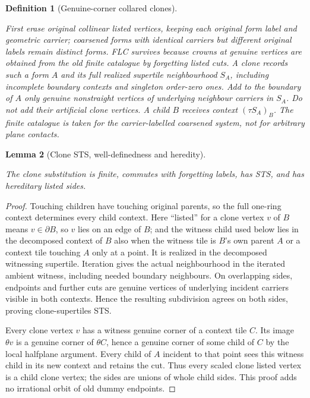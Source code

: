 \documentclass[11pt,a4paper]{article}
\newtheorem{definition}{Definition}[section]
\newtheorem{lemma}[definition]{Lemma}
\theoremstyle{remark}
\newcommand{\lean}[1]{}
\newcommand{\uses}[1]{}
\begin{document}
\begin{definition}[Genuine-corner collared clones]\label{def:clones}
\lean{Tilings.FLC.GenuineCornerClone,Tilings.FLC.refinedSubstitution}
\uses{lem:finite-neighbourhoods,def:substitution}
First erase original collinear listed vertices, keeping each original form
label and geometric carrier; coarsened forms with identical carriers but
different original labels remain distinct forms. FLC survives because crowns at genuine vertices
are obtained from the old finite catalogue by forgetting listed cuts.
A clone records such a form $A$ and its full realized supertile neighbourhood
$S_A$, including incomplete boundary contexts and singleton order-zero ones.
Add to the boundary of $A$ only genuine nonstraight vertices of underlying
neighbour carriers in $S_A$. Do not add their artificial clone vertices.
A child $B$ receives context $(\tau S_A)_B$. The finite catalogue is taken
for the carrier-labelled coarsened system, not for arbitrary plane contacts.
\end{definition}

\begin{lemma}[Clone STS, well-definedness and heredity]\label{lem:clone-sts}
\lean{Tilings.FLC.refinedSubstitution_sts,Tilings.FLC.refinedSubstitution_hereditary}
\uses{def:clones,def:sts,def:hereditary,lem:macrocorner}
The clone substitution is finite, commutes with forgetting labels, has STS,
and has hereditary listed sides.
\end{lemma}
\begin{proof}
Touching children have touching original parents, so the full one-ring
context determines every child context. Here ``listed'' for a clone vertex
$v$ of $B$ means $v\in\partial B$, so $v$ lies on an edge of $B$; and the
witness child used below lies in the decomposed context of $B$ also when
the witness tile is $B$'s own parent $A$ or a context tile touching $A$
only at a point. It is realized in the decomposed
witnessing supertile. Iteration gives the actual neighbourhood in the
iterated ambient witness, including needed boundary neighbours.
On overlapping sides, endpoints and further cuts are genuine vertices of
underlying incident carriers visible in both contexts. Hence the resulting
subdivision agrees on both sides, proving clone-supertiles STS.

Every clone vertex $v$ has a witness genuine corner of a context tile $C$.
Its image $\theta v$ is a genuine corner of $\theta C$, hence a genuine
corner of some child of $C$ by the local halfplane argument. Every child of
$A$ incident to that point sees this witness child in its new context and
retains the cut. Thus every scaled clone listed vertex is a child clone
vertex; the sides are unions of whole child sides. This proof adds no
irrational orbit of old dummy endpoints.
\end{proof}
\end{document}
